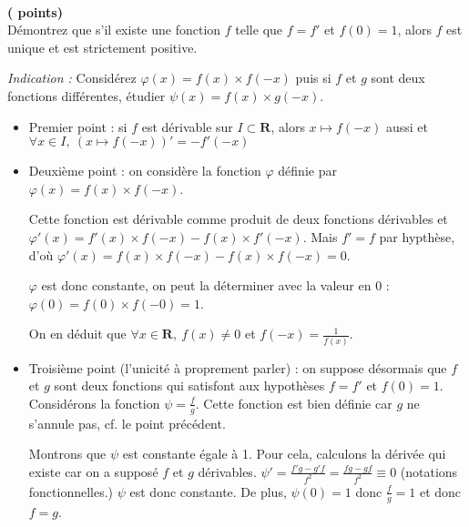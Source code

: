 \documentclass[12pt,a4paper,french]{article}
\newcommand{\R}{\mathbf{R}}
\theoremstyle{break}
\theoremstyle{plain}
\theoremstyle{nonumberplain}
\theoremstyle{nonumberbreak}
\begin{document}
\begin{question}[ID=ROC]
  ~\\[-6ex]
  \phantom{a}\hfill\textbf{( points)}\\
  Démontrez que s'il existe une fonction $f$ telle que $f = f'$ et $f(0)
  = 1$, alors $f$ est unique et est strictement positive.

  \emph{Indication :} Considérez $\varphi(x) = f(x)\times f(-x)$ puis si
  $f$ et $g$ sont deux fonctions différentes, étudier $\psi(x) =
  f(x)\times g(-x)$.
\end{question}
\begin{solution}
  \begin{itemize}
    \item Premier point : si $f$ est dérivable sur $I\subset \R$, alors
      $x\mapsto f(-x)$ aussi et $\forall x \in I,\ (x\mapsto f(-x))'  =
      -f'(-x)$
    \item Deuxième point : on considère la fonction $\varphi$ définie
      par $\varphi(x) = f(x)\times f(-x)$.

      Cette fonction est dérivable comme produit de deux fonctions
      dérivables et $\varphi'(x) = f'(x)\times f(-x) - f(x)\times
      f'(-x)$. Mais $f'=f$ par hypthèse, d'où $\varphi'(x) = f(x)\times
      f(-x) - f(x)\times f(-x) = 0$.

      $\varphi$ est donc constante, on peut la déterminer avec la valeur
      en 0 : $\varphi(0) = f(0) \times f(-0) = 1$.

      On en déduit que $\forall x\in \R,\ f(x) \neq 0$ et $f(-x) =
      \frac1{f(x)}$.
    \item Troisième point (l'unicité à proprement parler) : on suppose
      désormais que $f$ et $g$ sont deux fonctions qui satisfont aux
      hypothèses $f = f'$ et $f(0) = 1$. Considérons la fonction $\psi =
      \frac{f}{g}$. Cette fonction est bien définie car $g$ ne s'annule
      pas, cf. le  point précédent.

      Montrons que $\psi$ est constante égale à 1. Pour cela, calculons
      la dérivée qui existe car on a supposé $f$ et $g$ dérivables.
      $\psi' = \frac{f'g - g'f}{f^2} = \frac{fg -gf}{f^2} \equiv 0$
      (notations fonctionnelles.) $\psi$ est donc constante. De plus,
      $\psi(0) = 1$ donc $\frac{f}g = 1$ et donc $f=g$.
  \end{itemize}
\end{solution}
\end{document}
